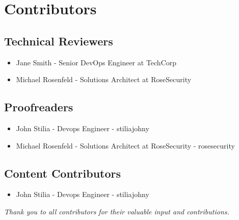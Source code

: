\chapter*{Contributors}
\section*{Technical Reviewers}
\begin{itemize}[noitemsep]
    \item Jane Smith - Senior DevOps Engineer at TechCorp
    \item Michael Rosenfeld - Solutions Architect at RoseSecurity
\end{itemize}

\section*{Proofreaders}
\begin{itemize}[noitemsep]
    \item John Stilia - Devops Engineer - stiliajohny
    \item Michael Rosenfeld - Solutions Architect at RoseSecurity - rosesecurity
\end{itemize}

\section*{Content Contributors}
\begin{itemize}[noitemsep]
    \item John Stilia - Devops Engineer - stiliajohny
\end{itemize}

\vspace{0.5cm}
\begin{center}
\small\emph{Thank you to all contributors for their valuable input and contributions.}
\end{center}

\clearpage

